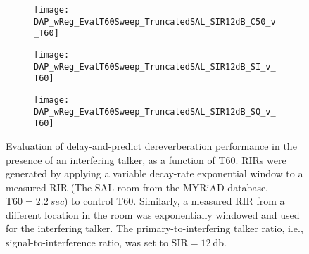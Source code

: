 \begin{figure}[H]
	\centering
	\begin{subfigure}[b]{0.47\textwidth}
		\centering
		\texttt{[image: DAP\_wReg\_EvalT60Sweep\_TruncatedSAL\_SIR12dB\_C50\_v\_T60]}
	\end{subfigure}
	\begin{subfigure}[b]{0.92\textwidth}
		\centering
		\texttt{[image: DAP\_wReg\_EvalT60Sweep\_TruncatedSAL\_SIR12dB\_SI\_v\_T60]}
	\end{subfigure}
	\begin{subfigure}[b]{0.92\textwidth}
		\centering
		\texttt{[image: DAP\_wReg\_EvalT60Sweep\_TruncatedSAL\_SIR12dB\_SQ\_v\_T60]}
	\end{subfigure}
	\caption{Evaluation of delay-and-predict dereverberation performance in the presence of an interfering talker, as a function of T60. RIRs were generated by applying a variable decay-rate exponential window to a measured RIR (The SAL room from the MYRiAD database, $\mathrm{T60} = \qty{2.2}{sec}$) to control T60. Similarly, a measured RIR from a different location in the room was exponentially windowed and used for the interfering talker. The primary-to-interfering talker ratio, i.e., signal-to-interference ratio, was set to $\mathrm{SIR} = \qty{12}{\decibel}$.}
	\label{fig:DAP_wReg_EvalT60Sweep_TruncatedSAL_SIR12dB}
\end{figure}


